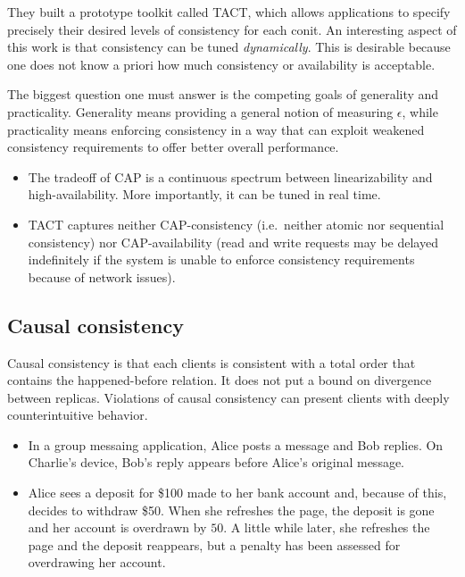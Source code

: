 \documentclass[]             %
{NASA}                       %
\theoremstyle{definition}
\providecommand{\tightlist}{%
  \setlength{\itemsep}{0pt}\setlength{\parskip}{0pt}}
\begin{document}
They built a prototype toolkit called TACT, which allows applications to
specify precisely their desired levels of consistency for each conit. An
interesting aspect of this work is that consistency can be tuned
\emph{dynamically}. This is desirable because one does not know a priori
how much consistency or availability is acceptable.

The biggest question one must answer is the competing goals of
generality and practicality. Generality means providing a general notion
of measuring \(\epsilon\), while practicality means enforcing
consistency in a way that can exploit weakened consistency requirements
to offer better overall performance.

\begin{itemize}
\item
  The tradeoff of CAP is a continuous spectrum between linearizability
  and high-availability. More importantly, it can be tuned in real time.
\item
  TACT captures neither CAP-consistency (i.e.~neither atomic nor
  sequential consistency) nor CAP-availability (read and write requests
  may be delayed indefinitely if the system is unable to enforce
  consistency requirements because of network issues).
\end{itemize}

\hypertarget{causal-consistency-1}{%
  \subsection{Causal consistency}\label{causal-consistency-1}}

Causal consistency is that each clients is consistent with a total order
that contains the happened-before relation. It does not put a bound on
divergence between replicas. Violations of causal consistency can
present clients with deeply counterintuitive behavior.

\begin{itemize}
  \tightlist
\item
  In a group messaing application, Alice posts a message and Bob
  replies. On Charlie's device, Bob's reply appears before Alice's
  original message.
\item
  Alice sees a deposit for \$100 made to her bank account and, because
  of this, decides to withdraw \$50. When she refreshes the page, the
  deposit is gone and her account is overdrawn by \(50\). A little while
  later, she refreshes the page and the deposit reappears, but a penalty
  has been assessed for overdrawing her account.
\end{itemize}
\end{document}
